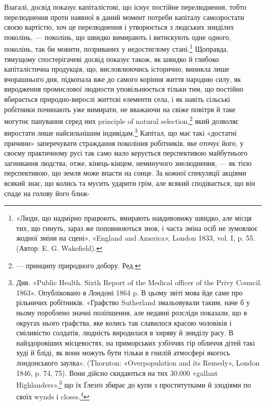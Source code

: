 Взагалі, досвід показує капіталістові, що існує постійне
перелюднення, тобто перелюднення проти наявної в даний момент
потреби капіталу самозростати своєю вартістю, хоч це перелюднення
і утворюється з людських зниділих поколінь, — поколінь,
що швидко вимирають і витискують одне одного, поколінь, так
би мовити, позриваних у недостиглому стані.\footnote{
«Люди, що надмірно працюють, вмирають навдивовижу швидко,
але місця тих, що гинуть, зараз же поповнюються знов, і часта зміна
осіб не зумовлює жодної зміни на сцені». «England and America»,
London 1833, vol. I, p. 55. (Автор: E. G. Wakefield).
} Щоправда,
тямущому спостерігачеві досвід показує також, як швидко
й глибоко капіталістична продукція, що, висловлюючись історично,
виникла лише вчорашнього дня, підкопала вже до
самого коріння життя народню силу, як виродження промислової
людности уповільнюється тільки тим, що постійно вбирається
природно-вирослі життєві елементи села, і як навіть сільські
робітники починають уже вимирати, не вважаючи на свіже повітря
й таке могутнє панування серед них principle of natural selection,\footnote*{
— принципу природного добору. Ред.
}
який дозволяє виростати лише найсильнішим індивідам.\footnote{
Див. «Public Health. Sixth Report of the Medical officer of the
Privy Council. 1863». Опубліковано в Лондоні 1864 p. В цьому звіті
мова йде саме про рільничих робітників. «Графство Sutherland змальовували
таким, наче б у ньому пороблено значні поліпшення, але недавні
розсліди показали, що в округах нього графства, яке колись так славилося
красою чоловіків і сміливістю солдатів, людність виродилася в
хиряву й зниділу расу. В найздоровіших місцевостях, на приморських
узбіччях гір обличчя дітей такі худі й бліді, як вони можуть бути
тільки в гнилій атмосфері якогось лондонського заулка». (Thornton:
«Overpopulation and its Remedy», London 1846, p. 74, 75). Вони дійсно
скидаються на тих 30.000 «gallant Highlanders»,\footnote*{
— бравих горян. Ред.
} що їх Ґлезґо збирає
до купи з проститутками й злодіями по своїх wynds і closes.\footnote*{
— заулках і вертепах. Ред.
}
}
Капітал, що має такі «достатні причини» заперечувати страждання
покоління робітників, яке оточує його, у своєму практичному
русі так само мало керується перспективою майбутнього загнивання
людства, отже, кінець-кінцем, неминучого знелюднення, —
як тією перспективою, що земля може впасти на сонце. За кожної
спекуляції акціями всякий знає, що колись та мусить ударити
грім, але всякий сподівається, що він спаде на голову його ближ-


